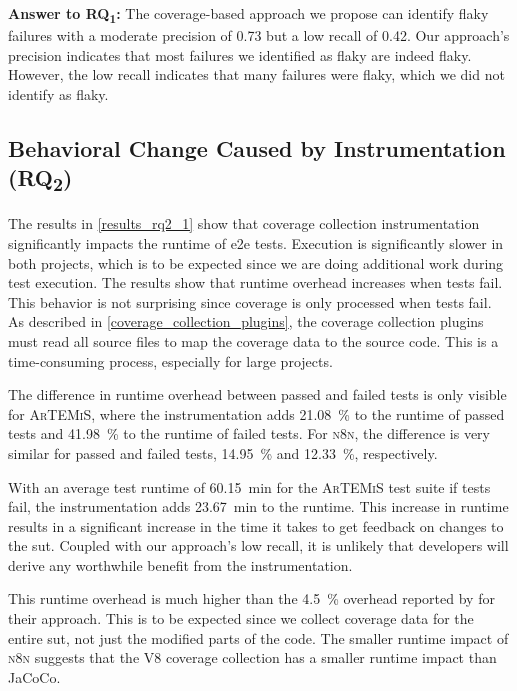 \begin{mdframed}
	\textbf{Answer to RQ\textsubscript{1}:} The coverage-based approach we propose can identify flaky failures with a moderate precision of \num{0.73} but a low recall of \num{0.42}.
	Our approach's precision indicates that most failures we identified as flaky are indeed flaky.
	However, the low recall indicates that many failures were flaky, which we did not identify as flaky.
\end{mdframed}

\subsection{Behavioral Change Caused by Instrumentation (\texorpdfstring{RQ\textsubscript{2}}{RQ2})}

The results in \cref{results_rq2_1} show that coverage collection instrumentation significantly impacts the runtime of \ac{e2e} tests.
Execution is significantly slower in both projects, which is to be expected since we are doing additional work during test execution.
The results show that runtime overhead increases when tests fail.
This behavior is not surprising since coverage is only processed when tests fail.
As described in \cref{coverage_collection_plugins}, the coverage collection plugins must read all source files to map the coverage data to the source code.
This is a time-consuming process, especially for large projects.

The difference in runtime overhead between passed and failed tests is only visible for \textsc{ArTEMiS}, where the instrumentation adds \SI{21.08}{\percent} to the runtime of passed tests and \SI{41.98}{\percent} to the runtime of failed tests.
For \textsc{n8n}, the difference is very similar for passed and failed tests, \SI{14.95}{\percent} and \SI{12.33}{\percent}, respectively.

With an average test runtime of \SI{60.15}{\minute} for the \textsc{ArTEMiS} test suite if tests fail, the instrumentation adds \SI{23.67}{\minute} to the runtime.
This increase in runtime results in a significant increase in the time it takes to get feedback on changes to the \ac{sut}.
Coupled with our approach's low recall, it is unlikely that developers will derive any worthwhile benefit from the instrumentation.

This runtime overhead is much higher than the \SI{4.5}{\percent} overhead reported by \citeauthor*{bell_deflaker_2018} for their approach.
This is to be expected since we collect coverage data for the entire \ac{sut}, not just the modified parts of the code.
The smaller runtime impact of \textsc{n8n} suggests that the V8 coverage collection has a smaller runtime impact than JaCoCo.

